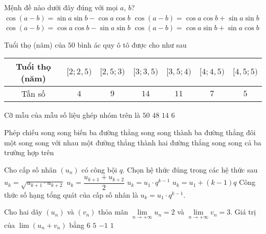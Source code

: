 \begin{ex}%
	Mệnh đề nào dưới đây đúng với mọi $a$, $b$?
	\choice
	{$\cos{\left(a - b \right)} = \sin{a} \sin{b} - \cos{a}\cos{b}$}
	{\True $\cos{\left(a - b \right)} = \cos{a}\cos{b} + \sin{a} \sin{b}$}
	{$\cos{\left(a - b \right)} = \cos{a}\cos{b} - \sin{a} \sin{b}$}
	{$\cos{\left(a - b \right)} = \cos{a}\sin{b} + \sin{a} \cos{b}$}
\end{ex}

\begin{ex}%
	Tuổi thọ (năm) của $50$ bình ác quy ô tô được cho như sau
	\begin{center}
		\begin{tabular}{|c|c|c|c|c|c|c|}
			\hline
			Tuổi thọ (năm) & $[2;2{,}5)$ & $[2{,}5;3)$ & $[3;3{,}5)$ & $[3{,}5;4)$ & $[4;4{,}5)$ & $[4{,}5;5)$ \\
			\hline
			Tần số         & $4$         & $9$         & $14$        & $11$        & $7$         & $5$         \\
			\hline
		\end{tabular}
	\end{center}
	Cỡ mẫu của mẫu số liệu ghép nhóm trên là
	\choice
	{\True $50$}
	{$48$}
	{$14$}
	{$6$}
\end{ex}

\begin{ex}%
	Phép chiếu song song biến ba đường thẳng song song thành
	\choice
	{ba đường thẳng đôi một song song với nhau}
	{một đường thẳng}
	{thành hai đường thẳng song song}
	{\True cả ba trường hợp trên}
\end{ex}

\begin{ex}%
	Cho cấp số nhân $(u_n)$ có công bội $q$. Chọn hệ thức đúng trong các hệ thức sau
	\choice
	{$u_k=\sqrt{u_{k+1}\cdot u_{k+2}}$}
	{$u_k=\dfrac{u_{k+1}+u_{k+2}}{2}$}
	{\True $u_k=u_1\cdot q^{k-1}$}
	{$u_k=u_1+(k-1)q$}
	\loigiai
	{
		Công thức số hạng tổng quát của cấp số nhân là $u_k=u_1\cdot q^{k-1}$.
	}
\end{ex}

\begin{ex}%
	Cho hai dãy $\left(u_n\right)$ và $\left(v_n\right)$ thỏa mãn $\lim \limits_{n \to +\infty}u_n=2$ và $\lim \limits_{n \to +\infty}v_n=3.$ Giá trị của $\lim\left(u_n+v_n\right)$ bằng
	\choice
	{$ 6$}
	{\True $ 5$}
	{$-1$}
	{$ 1$}

\end{ex}

